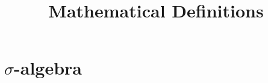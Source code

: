 \documentclass[12pt]{paper}
\begin{document}
\title{Mathematical Definitions}
\maketitle
\section{$\sigma$-algebra}
\end{document}
